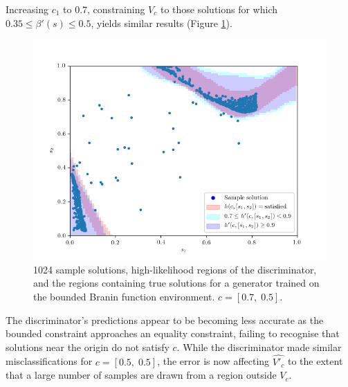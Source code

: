 \documentclass[../../main.tex]{subfiles}
\begin{document}
Increasing $c_1$ to $0.7$, constraining $V_c$ to those solutions for which $0.35\le\beta'(s)\le0.5$, yields similar results (Figure \ref{fig:equality07}).
\begin{figure}[H]
    \begin{center}
    \includegraphics[width=\textwidth]{equality07}
    \caption{
        1024 sample solutions, high-likelihood regions of the discriminator, and the regions containing true solutions for a generator trained on the bounded Branin function environment.
        $c=[0.7,\;0.5]$.
    }
    \label{fig:equality07}
    \end{center}
\end{figure}
The discriminator's predictions appear to be becoming less accurate as the bounded constraint approaches an equality constraint, failing to recognise that solutions near the origin do not satisfy $c$.
While the discriminator made similar misclassifications for $c=[0.5,\;0.5]$, the error is now affecting $\hat{V'_c}$ to the extent that a large number of samples are drawn from a region outside $V_c$.
\end{document}
